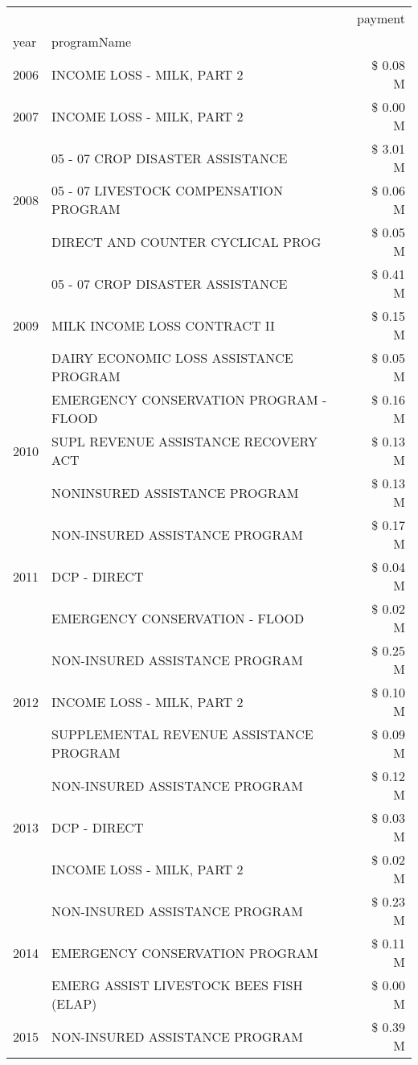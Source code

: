 \begin{tabular}{llr}
\toprule
 &  & payment \\
year & programName &  \\
\midrule
2006 & INCOME LOSS - MILK, PART 2 & \$ 0.08 M \\
\cline{1-3}
2007 & INCOME LOSS - MILK, PART 2 & \$ 0.00 M \\
\cline{1-3}
\multirow[t]{3}{*}{2008} & 05 - 07 CROP DISASTER ASSISTANCE & \$ 3.01 M \\
 & 05 - 07 LIVESTOCK COMPENSATION PROGRAM & \$ 0.06 M \\
 & DIRECT AND COUNTER CYCLICAL PROG & \$ 0.05 M \\
\cline{1-3}
\multirow[t]{3}{*}{2009} & 05 - 07 CROP DISASTER ASSISTANCE & \$ 0.41 M \\
 & MILK INCOME LOSS CONTRACT II & \$ 0.15 M \\
 & DAIRY ECONOMIC LOSS ASSISTANCE PROGRAM & \$ 0.05 M \\
\cline{1-3}
\multirow[t]{3}{*}{2010} & EMERGENCY CONSERVATION PROGRAM - FLOOD & \$ 0.16 M \\
 & SUPL REVENUE ASSISTANCE RECOVERY ACT & \$ 0.13 M \\
 & NONINSURED ASSISTANCE PROGRAM & \$ 0.13 M \\
\cline{1-3}
\multirow[t]{3}{*}{2011} & NON-INSURED ASSISTANCE PROGRAM & \$ 0.17 M \\
 & DCP - DIRECT & \$ 0.04 M \\
 & EMERGENCY CONSERVATION - FLOOD & \$ 0.02 M \\
\cline{1-3}
\multirow[t]{3}{*}{2012} & NON-INSURED ASSISTANCE PROGRAM & \$ 0.25 M \\
 & INCOME LOSS - MILK, PART 2 & \$ 0.10 M \\
 & SUPPLEMENTAL REVENUE ASSISTANCE PROGRAM & \$ 0.09 M \\
\cline{1-3}
\multirow[t]{3}{*}{2013} & NON-INSURED ASSISTANCE PROGRAM & \$ 0.12 M \\
 & DCP - DIRECT & \$ 0.03 M \\
 & INCOME LOSS - MILK, PART 2 & \$ 0.02 M \\
\cline{1-3}
\multirow[t]{3}{*}{2014} & NON-INSURED ASSISTANCE PROGRAM & \$ 0.23 M \\
 & EMERGENCY CONSERVATION PROGRAM & \$ 0.11 M \\
 & EMERG ASSIST LIVESTOCK BEES FISH (ELAP) & \$ 0.00 M \\
\cline{1-3}
\multirow[t]{3}{*}{2015} & NON-INSURED ASSISTANCE PROGRAM & \$ 0.39 M \\

\end{tabular}
